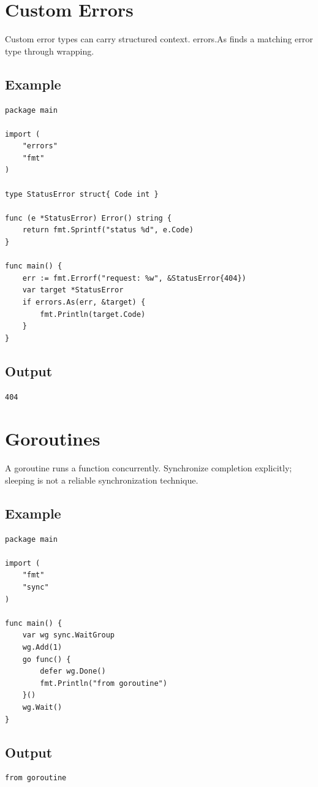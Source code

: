 \documentclass[10pt,oneside]{article}
\newcommand{\sectionline}{\par\vspace{4pt}{\color{rule}\hrule height .5pt}\vspace{7pt}\color{ink}\noindent}
\begin{document}
\section{Custom Errors}
\sectionline
Custom error types can carry structured context. errors.As finds a matching error type through wrapping.\par
\subsection*{Example}
\begin{lstlisting}[style=gocode]
package main

import (
	"errors"
	"fmt"
)

type StatusError struct{ Code int }

func (e *StatusError) Error() string {
	return fmt.Sprintf("status %d", e.Code)
}

func main() {
	err := fmt.Errorf("request: %w", &StatusError{404})
	var target *StatusError
	if errors.As(err, &target) {
		fmt.Println(target.Code)
	}
}
\end{lstlisting}
\subsection*{Output}
\begin{lstlisting}[style=terminal]
404
\end{lstlisting}
\clearpage
\section{Goroutines}
\sectionline
A goroutine runs a function concurrently. Synchronize completion explicitly; sleeping is not a reliable synchronization technique.\par
\subsection*{Example}
\begin{lstlisting}[style=gocode]
package main

import (
	"fmt"
	"sync"
)

func main() {
	var wg sync.WaitGroup
	wg.Add(1)
	go func() {
		defer wg.Done()
		fmt.Println("from goroutine")
	}()
	wg.Wait()
}
\end{lstlisting}
\subsection*{Output}
\begin{lstlisting}[style=terminal]
from goroutine
\end{lstlisting}
\clearpage
\end{document}
